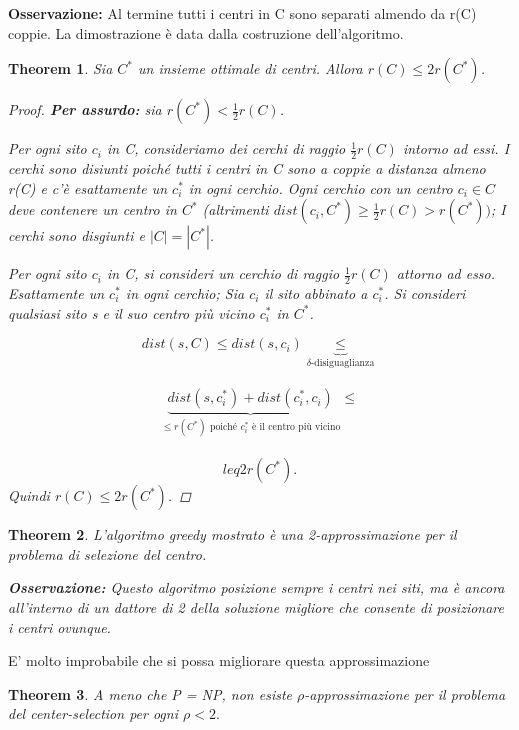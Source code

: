 \documentclass{article}
\newtheorem{theorem}{Theorem}[subsection]
\begin{document}
\noindent\textbf{Osservazione:} Al termine tutti i centri in C sono separati almendo da r(C) coppie. La dimostrazione è data dalla costruzione dell'algoritmo.
\begin{theorem}
    Sia $C^*$ un insieme ottimale di centri. Allora $r(C)\leq 2r(C^*)$.
    \begin{proof}
        \textbf{Per assurdo:} sia $r(C^*)<\frac{1}{2}r(C)$.

        \noindent Per ogni sito $c_i$ in C, consideriamo dei cerchi di raggio $\frac{1}{2}r(C)$ intorno ad essi.
        I cerchi sono disiunti poiché tutti i centri in C sono a coppie a distanza almeno r(C) e c'è esattamente un $c_i^*$ in ogni cerchio.  Ogni cerchio con un centro $c_i\in C$ deve contenere un centro in $C^*$ (altrimenti $dist(c_i,C^*)\geq\frac{1}{2}r(C)>r(C^*))$; I cerchi sono disgiunti e $|C|=|C^*|$.

        \noindent Per ogni sito $c_i$ in C, si consideri un cerchio di raggio $\frac{1}{2}r(C)$ attorno ad esso. Esattamente un $c_i^*$ in ogni cerchio; Sia $c_i$ il sito abbinato a $c_i^*$. Si consideri qualsiasi sito s e il suo centro più vicino $c_i^*$ in $C^*$. 

           $$dist(s, C)\leq 
 dist(s,c_i) \underbrace{\leq}_{\delta\text{-disiguaglianza}}$$\\
$$ \underbrace{dist(s,c_i^*) + dist(c_i^*,c_i)}_{\leq r(C^*)\text{ poiché }c_i^* \text{ è il centro più vicino}} \leq$$ \\
 $$ leq 2r(C^*).$$
 Quindi $r(C) \leq 2r(C^*)$.
    \end{proof}
\end{theorem}
\begin{theorem}
    L'algoritmo greedy mostrato è una 2-approssimazione per il problema di selezione del centro.
    
    \noindent \textbf{Osservazione: } Questo algoritmo posizione sempre i centri nei siti, ma è ancora all'interno di un dattore di 2 della soluzione migliore che consente di posizionare i centri ovunque.
\end{theorem}
\noindent E' molto improbabile che si possa migliorare questa approssimazione
\begin{theorem}
    A meno che P = NP, non esiste $\rho$-approssimazione per il problema del center-selection per ogni $\rho<2.$
\end{theorem}
\end{document}
